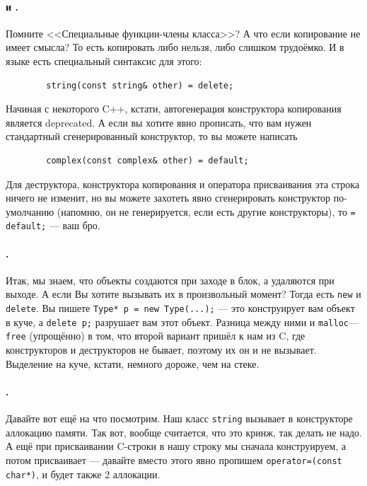 \documentclass{article}
\begin{document}
    \paragraph{ и .}
    Помните <<Специальные функции-члены класса>>? А что если копирование не имеет смысла? То есть копировать либо нельзя, либо слишком трудоёмко. И в языке есть специальный синтаксис для этого:
    \begin{verbatim}
        string(const string& other) = delete;
    \end{verbatim}
    Начиная с некоторого C++, кстати, автогенерация конструктора копирования является deprecated. А если вы хотите явно прописать, что вам нужен стандартный сгенерированный конструктор, то вы можете написать
    \begin{verbatim}
        complex(const complex& other) = default;
    \end{verbatim}
    Для деструктора, конструктора копирования и оператора присваивания эта строка ничего не изменит, но вы можете захотеть явно сгенерировать конструктор по-умолчанию (напомню, он не генерируется, если есть другие конструкторы), то \texttt{= default;} --- ваш бро.
    \paragraph{.}
    Итак, мы знаем, что объекты создаются при заходе в блок, а удаляются при выходе. А если Вы хотите вызывать их в произвольный момент? Тогда есть \texttt{new} и \texttt{delete}. Вы пишете \texttt{Type* p = new Type(...);} --- это конструирует вам объект в куче, а \texttt{delete p;} разрушает вам этот объект. Разница между ними и \texttt{malloc}---\texttt{free} (упрощённо) в том, что второй вариант пришёл к нам из C, где конструкторов и деструкторов не бывает, поэтому их он и не вызывает. Выделение на куче, кстати, немного дороже, чем на стеке.
    \paragraph{.}
    Давайте вот ещё на что посмотрим. Наш класс \texttt{string} вызывает в конструкторе аллокацию памяти. Так вот, вообще считается, что это кринж, так делать не надо. А ещё при присваивании C-строки в нашу строку мы сначала конструируем, а потом присваивает --- давайте вместо этого явно пропишем \texttt{operator=(const char*)}, и будет также 2 аллокации.
\end{document}
